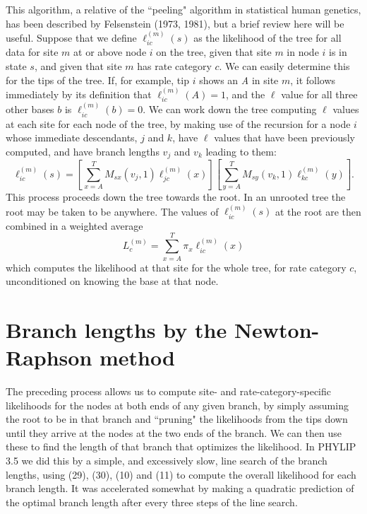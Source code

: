 \documentclass[12pt]{article}
\begin{document}
This algorithm, a relative of the ``peeling" algorithm in statistical human
genetics, has been described by Felsenstein (1973, 1981), but a brief
review here will be useful.  Suppose that we define $\ell_{ic}^{(m)}(s)$ as the
likelihood of the tree for all data for site $m$ at or above node $i$ on the tree,
given that site $m$ in node $i$ is in state $s$, and given that site $m$ has
rate category $c$.  We can easily determine this for the
tips of the tree.  If, for example, tip $i$ shows an {\it A} in site $m$,
it follows immediately by its definition that $\ell_{ic}^{(m)}(A) = 1 $, and the
$\ell$ value for all three other bases $b$ is $\ell_{ic}^{(m)}(b) = 0$.  We can work
down the tree computing $\ell$ values at each site for each node of the tree,
by making use of the recursion for a node $i$ whose immediate descendants,
$j$ and $k$, have $\ell$ values that have been previously computed,
and have branch lengths $v_j$ and $v_k$ leading to them:
\begin{equation} %
\ell_{ic}^{(m)}(s) = \left[ \sum_{x=A}^T M_{sx} (v_j, 1) \ell_{jc}^{(m)}(x)\right] \left[ \sum_{y=A}^T M_{sy} (v_k, 1) \ell_{kc}^{(m)} (y) \right].
\end{equation}
This process proceeds down the tree towards the root.  In an unrooted tree
the root may be taken to be anywhere.  The values of $\ell_{ic}^{(m)}(s)$ at the
root are then combined in a weighted average
\begin{equation} %
L_c^{(m)} = \sum_{x=A}^T \pi_x \ell_{ic}^{(m)}(x)
\end{equation}
which computes the likelihood at that site for the whole tree, for rate
category $c$, unconditioned on knowing the base at that node.

\section*{Branch lengths by the Newton-Raphson method}

The preceding process allows us to compute site- and rate-category-specific
likelihoods for the nodes at both ends of any given branch, by simply assuming
the root to be in that branch and ``pruning" the likelihoods from the tips
down until they arrive at the nodes at the two ends of the branch.  We can
then use these to find the length of that branch that optimizes the
likelihood.  In PHYLIP 3.5 we did this by a simple, and excessively slow,
line search of the branch lengths, using (29), (30), (10) and (11) to
compute the overall likelihood for each branch length.  It was accelerated
somewhat by making a quadratic prediction of the optimal branch length after
every three steps of the line search.
\end{document}
